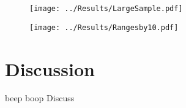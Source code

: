 \documentclass[12pt]{article}
\begin{document}
  \begin{figure}[]
    \texttt{[image: ../Results/LargeSample.pdf]}
  \end{figure}

  \begin{figure}[]
    \texttt{[image: ../Results/Rangesby10.pdf]}
  \end{figure}


  \section{Discussion}
  beep boop Discuss

  
  
\end{document}
